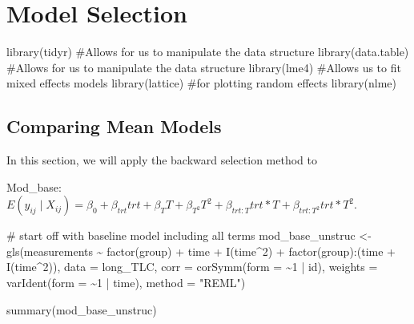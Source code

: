 \documentclass[
  letterpaper,
  DIV=11,
  numbers=noendperiod]{scrreprt}
\newenvironment{Shaded}{\begin{snugshade}}{\end{snugshade}}
\newcommand{\AttributeTok}[1]{\textcolor[rgb]{0.40,0.45,0.13}{#1}}
\newcommand{\CommentTok}[1]{\textcolor[rgb]{0.37,0.37,0.37}{#1}}
\newcommand{\DecValTok}[1]{\textcolor[rgb]{0.68,0.00,0.00}{#1}}
\newcommand{\FunctionTok}[1]{\textcolor[rgb]{0.28,0.35,0.67}{#1}}
\newcommand{\NormalTok}[1]{\textcolor[rgb]{0.00,0.23,0.31}{#1}}
\newcommand{\OtherTok}[1]{\textcolor[rgb]{0.00,0.23,0.31}{#1}}
\newcommand{\SpecialCharTok}[1]{\textcolor[rgb]{0.37,0.37,0.37}{#1}}
\newcommand{\StringTok}[1]{\textcolor[rgb]{0.13,0.47,0.30}{#1}}
\begin{document}
\hypertarget{sec-longi-modelselection}{%
\chapter{Model Selection}\label{sec-longi-modelselection}}

\begin{Shaded}
\begin{Highlighting}[]
\FunctionTok{library}\NormalTok{(tidyr)  }\CommentTok{\#Allows for us to manipulate the data structure}
\FunctionTok{library}\NormalTok{(data.table)  }\CommentTok{\#Allows for us to manipulate the data structure}
\FunctionTok{library}\NormalTok{(lme4)  }\CommentTok{\#Allows us to fit mixed effects models}
\FunctionTok{library}\NormalTok{(lattice)  }\CommentTok{\#for plotting random effects}
\FunctionTok{library}\NormalTok{(nlme)}
\end{Highlighting}
\end{Shaded}

\hypertarget{comparing-mean-models}{%
\section{Comparing Mean Models}\label{comparing-mean-models}}

In this section, we will apply the backward selection method to

Mod\_base:
\(E(y_{ij} \mid X_{ij}) = \beta_0 + \beta_{trt}trt + \beta_{T}T + \beta_{T^2}T^2 + \beta_{trt:T}trt*T+\beta_{trt:T^2}trt*T^2\).

\begin{Shaded}
\begin{Highlighting}[]
\CommentTok{\# start off with baseline model including all terms}
\NormalTok{mod\_base\_unstruc }\OtherTok{\textless{}{-}} \FunctionTok{gls}\NormalTok{(measurements }\SpecialCharTok{\textasciitilde{}} \FunctionTok{factor}\NormalTok{(group) }\SpecialCharTok{+}\NormalTok{ time }\SpecialCharTok{+} \FunctionTok{I}\NormalTok{(time}\SpecialCharTok{\^{}}\DecValTok{2}\NormalTok{) }\SpecialCharTok{+} \FunctionTok{factor}\NormalTok{(group)}\SpecialCharTok{:}\NormalTok{(time }\SpecialCharTok{+}
    \FunctionTok{I}\NormalTok{(time}\SpecialCharTok{\^{}}\DecValTok{2}\NormalTok{)), }\AttributeTok{data =}\NormalTok{ long\_TLC, }\AttributeTok{corr =} \FunctionTok{corSymm}\NormalTok{(}\AttributeTok{form =} \SpecialCharTok{\textasciitilde{}}\DecValTok{1} \SpecialCharTok{|}\NormalTok{ id), }\AttributeTok{weights =} \FunctionTok{varIdent}\NormalTok{(}\AttributeTok{form =} \SpecialCharTok{\textasciitilde{}}\DecValTok{1} \SpecialCharTok{|}
\NormalTok{    time), }\AttributeTok{method =} \StringTok{"REML"}\NormalTok{)}

\FunctionTok{summary}\NormalTok{(mod\_base\_unstruc)}
\end{Highlighting}
\end{Shaded}
\end{document}
